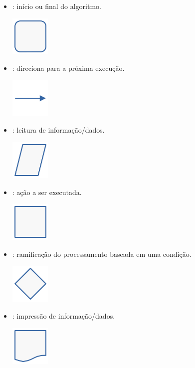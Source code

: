 \begin{itemize}
\item {}: início ou final do algoritmo.
  \begin{center}
    \includegraphics[width=0.75in]{./cap_lingua/dados/fig_fluxograma/terminal.png}
  \end{center}  
\item {}: direciona para a próxima execução.
  \begin{center}
    \includegraphics[width=0.75in]{./cap_lingua/dados/fig_fluxograma/linha.png}
  \end{center}
\item {}: leitura de informação/dados.
  \begin{center}
    \includegraphics[width=0.75in]{./cap_lingua/dados/fig_fluxograma/entrada.png}
  \end{center}  
\item {}: ação a ser executada.
  \begin{center}
    \includegraphics[width=0.75in]{./cap_lingua/dados/fig_fluxograma/processo.png}
  \end{center}
\item {}: ramificação do processamento baseada em uma condição.
  \begin{center}
    \includegraphics[width=0.75in]{./cap_lingua/dados/fig_fluxograma/decisao.png}
  \end{center}
\item {}: impressão de informação/dados.
  \begin{center}
    \includegraphics[width=0.75in]{./cap_lingua/dados/fig_fluxograma/saida.png}
\end{center}
\end{itemize}

